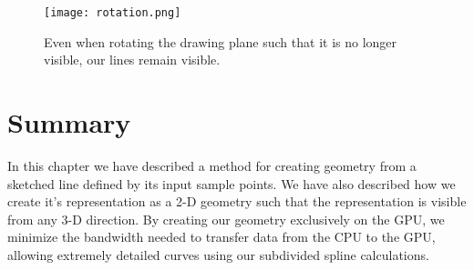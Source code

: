 \begin{figure}
\begin{center}
\texttt{[image: rotation.png]}
\caption{Even when rotating the drawing plane such that it is no longer visible, our lines remain visible.}
\end{center}
\end{figure}

\section{Summary}

In this chapter we have described a method for creating geometry from a sketched line defined by its input sample points.
We have also described how we create it's representation as a 2-D geometry such that the representation is visible from any 3-D direction.
By creating our geometry exclusively on the GPU, we minimize the bandwidth needed to transfer data from the CPU to the GPU, allowing extremely detailed curves using our subdivided spline calculations.